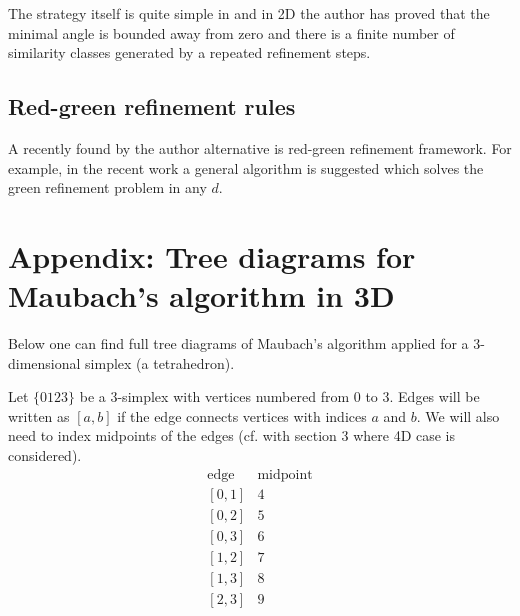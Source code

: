 \documentclass[a4paper,12pt]{amsart}
\numberwithin{equation}{section}
\begin{document}
The strategy itself is quite simple in \cite{rivara} and in 2D the author has proved that the minimal angle is bounded away from zero and there is a finite number of similarity classes generated by a repeated refinement steps.

\subsection{Red-green refinement rules}
A recently found by the author alternative is red-green refinement framework. For example, in the recent work \cite{grande} a general algorithm is suggested which solves the green refinement problem in any $d$.

\section{Appendix: Tree diagrams for Maubach's algorithm in 3D}

Below one can find full tree diagrams of Maubach's algorithm applied for a 3-dimensional simplex (a tetrahedron).

Let $\{0123\}$ be a 3-simplex with vertices numbered from 0 to 3. Edges will be written as $[a,b]$ if the edge connects vertices with indices $a$ and $b$.
We will also need to index midpoints of the edges (cf. with section 3 where 4D case is considered). 
$$
\begin{array}{cc}
\mbox{edge} & \mbox{midpoint} \\
\left[0,1\right] & 4 \\
\left[0,2\right] & 5 \\
\left[0,3\right] & 6 \\
\left[1,2\right] & 7 \\
\left[1,3\right] & 8 \\
\left[2,3\right] & 9 \\
\end{array}
$$

\end{document}
